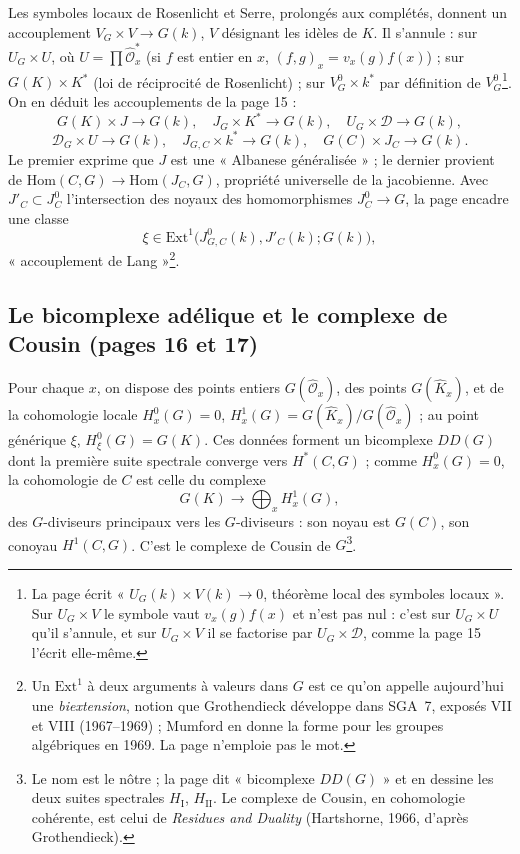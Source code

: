 \documentclass[11pt,a4paper]{article}
\begin{document}
Les symboles locaux de Rosenlicht et Serre, prolongés aux complétés, donnent un
accouplement $V_G \times V \to G(k)$, $V$ désignant les idèles de $K$. Il
s'annule : sur $U_G \times U$, où $U = \prod \hat{\mathcal{O}}_x^{*}$ (si $f$ est
entier en $x$, $(f, g)_x = v_x(g) f(x)$) ; sur $G(K) \times K^{*}$ (loi de
réciprocité de Rosenlicht) ; sur $V^0_G \times k^{*}$ par définition de
$V^0_G$\footnote{La page écrit « $U_G(k) \times V(k) \to 0$, théorème local des
symboles locaux ». Sur $U_G \times V$ le symbole vaut $v_x(g) f(x)$ et n'est pas
nul : c'est sur $U_G \times U$ qu'il s'annule, et sur $U_G \times V$ il se
factorise par $U_G \times \mathcal{D}$, comme la page 15 l'écrit elle-même.}. On
en déduit les accouplements de la page 15 :
\[
G(K) \times J \to G(k),\quad J_G \times K^{*} \to G(k),\quad
U_G \times \mathcal{D} \to G(k),
\]
\[
\mathcal{D}_G \times U \to G(k),
\quad J_{G,C} \times k^{*} \to G(k),\quad G(C) \times J_C \to G(k).
\]
Le premier exprime que $J$ est une « Albanese généralisée » ; le dernier provient
de $\mathrm{Hom}(C, G) \to \mathrm{Hom}(J_C, G)$, propriété universelle de la
jacobienne. Avec $J'_C \subset J^0_C$ l'intersection des noyaux des
homomorphismes $J^0_C \to G$, la page encadre une classe
\[
\xi \in \mathrm{Ext}^1\bigl(J^0_{G,C}(k), J'_C(k); G(k)\bigr),
\]
« accouplement de Lang »\footnote{Un $\mathrm{Ext}^1$ à deux arguments à valeurs
dans $G$ est ce qu'on appelle aujourd'hui une \emph{biextension}, notion que
Grothendieck développe dans SGA~7, exposés VII et VIII (1967--1969) ; Mumford en
donne la forme pour les groupes algébriques en 1969. La page n'emploie pas le
mot.}.

\subsection*{Le bicomplexe adélique et le complexe de Cousin (pages 16 et 17)}

Pour chaque $x$, on dispose des points entiers $G(\hat{\mathcal{O}}_x)$, des points
$G(\hat K_x)$, et de la cohomologie locale $H^0_x(G) = 0$, $H^1_x(G) =
G(\hat K_x)/G(\hat{\mathcal{O}}_x)$ ; au point générique $\xi$, $H^0_\xi(G) = G(K)$.
Ces données forment un bicomplexe $DD(G)$ dont la première suite spectrale
converge vers $H^{*}(C, G)$ ; comme $H^0_x(G) = 0$, la cohomologie de $C$ est
celle du complexe
\[
G(K) \longrightarrow \bigoplus_x H^1_x(G),
\]
des $G$-diviseurs principaux vers les $G$-diviseurs : son noyau est $G(C)$, son
conoyau $H^1(C, G)$. C'est le complexe de Cousin de $G$\footnote{Le nom est le
nôtre ; la page dit « bicomplexe $DD(G)$ » et en dessine les deux suites
spectrales $H_{\mathrm{I}}$, $H_{\mathrm{II}}$. Le complexe de Cousin, en
cohomologie cohérente, est celui de \emph{Residues and Duality} (Hartshorne, 1966,
d'après Grothendieck).}.
\end{document}
